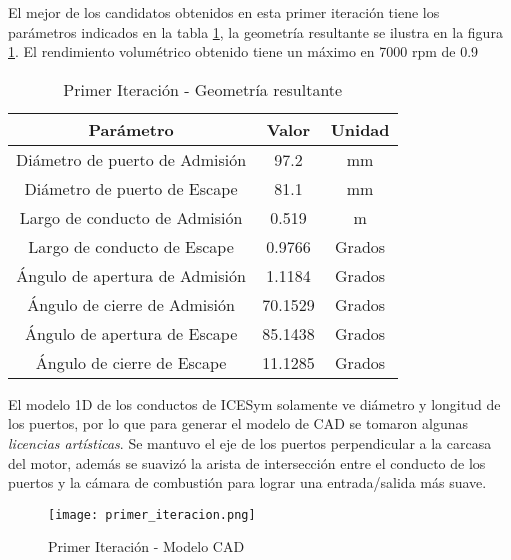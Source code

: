 El mejor de los candidatos obtenidos en esta primer iteración tiene los
parámetros indicados en la tabla \ref{tab:primer_it}, la geometría resultante se
ilustra en la figura \ref{fig:primer_it}.
%
El rendimiento volumétrico obtenido tiene un máximo en 7000 rpm de 0.9

\begin{table}
    \centering
    \begin{tabular}{ccc}
      \toprule
      Parámetro & Valor & Unidad\\
      \midrule
      Diámetro de puerto de Admisión & 97.2    & mm\\
      Diámetro de puerto de Escape   & 81.1    & mm \\
      Largo de conducto de Admisión  & 0.519   & m\\
      Largo de conducto de Escape    & 0.9766  & Grados\\
      Ángulo de apertura de Admisión & 1.1184  & Grados\\
      Ángulo de cierre de Admisión   & 70.1529 & Grados\\
      Ángulo de apertura de Escape   & 85.1438 & Grados\\
      Ángulo de cierre de Escape     & 11.1285 & Grados\\ \bottomrule
    \end{tabular}
    \caption{Primer Iteración - Geometría resultante}
    \label{tab:primer_it}
\end{table}

El modelo 1D de los conductos de ICESym solamente ve diámetro y longitud  de los
puertos, por lo que para generar el modelo de CAD se tomaron algunas
\emph{licencias artísticas}.
%
Se mantuvo el eje de los puertos perpendicular a la carcasa del motor, además se
suavizó la arista de intersección entre el conducto de los puertos y la cámara
de combustión para lograr una entrada/salida más suave.

\begin{figure}
  \centering
  \texttt{[image: primer\_iteracion.png]}
  \caption{Primer Iteración - Modelo CAD}
  \label{fig:primer_it}
\end{figure}
